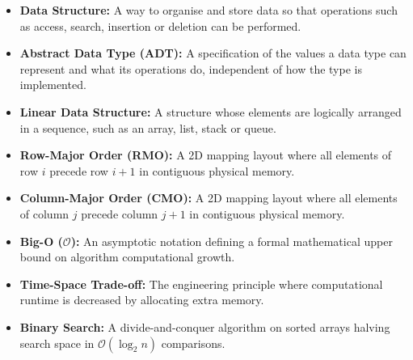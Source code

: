 \documentclass[12pt,a4paper]{article}
\begin{document}
\begin{tcolorbox}[defbox, title={\textbf{One-Line Definitions}}]
\begin{itemize}[leftmargin=*, itemsep=2pt, topsep=0pt]
  \item \textbf{Data Structure:} A way to organise and store data so that operations such as access, search, insertion or deletion can be performed.
  \item \textbf{Abstract Data Type (ADT):} A specification of the values a data type can represent and what its operations do, independent of how the type is implemented.
  \item \textbf{Linear Data Structure:} A structure whose elements are logically arranged in a sequence, such as an array, list, stack or queue.
  \item \textbf{Row-Major Order (RMO):} A 2D mapping layout where all elements of row $i$ precede row $i+1$ in contiguous physical memory.
  \item \textbf{Column-Major Order (CMO):} A 2D mapping layout where all elements of column $j$ precede column $j+1$ in contiguous physical memory.
  \item \textbf{Big-O ($\mathcal{O}$):} An asymptotic notation defining a formal mathematical upper bound on algorithm computational growth.
  \item \textbf{Time-Space Trade-off:} The engineering principle where computational runtime is decreased by allocating extra memory.
  \item \textbf{Binary Search:} A divide-and-conquer algorithm on sorted arrays halving search space in $\mathcal{O}(\log_2 n)$ comparisons.
\end{itemize}
\end{tcolorbox}

\newpage
\end{document}
